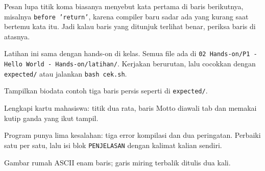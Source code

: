 \documentclass[a4paper]{article}
\begin{document}
Pesan lupa titik koma biasanya menyebut kata pertama di baris berikutnya, misalnya \texttt{before 'return'}, karena compiler baru sadar ada yang kurang saat bertemu kata itu. Jadi kalau baris yang ditunjuk terlihat benar, periksa baris di atasnya.

Latihan ini sama dengan hands-on di kelas. Semua file ada di \texttt{02 Hands-on/P1 - Hello World - Hands-on/latihan/}. Kerjakan berurutan, lalu cocokkan dengan \texttt{expected/} atau jalankan \texttt{bash cek.sh}.
\par\vspace{4pt}\par\vspace{6pt}
Tampilkan biodata contoh tiga baris persis seperti di \texttt{expected/}.

Lengkapi kartu mahasiswa: titik dua rata, baris Motto diawali tab dan memakai kutip ganda yang ikut tampil.

Program punya lima kesalahan: tiga error kompilasi dan dua peringatan. Perbaiki satu per satu, lalu isi blok \texttt{PENJELASAN} dengan kalimat kalian sendiri.

Gambar rumah ASCII enam baris; garis miring terbalik ditulis dua kali.
\end{document}
